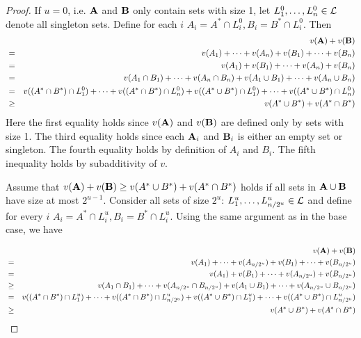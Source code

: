 \begin{proof}
\smallskip
{} If $u=0$, i.e. $\mathbf{A}$ and $\mathbf{B}$ only contain sets with size 1, let $L^{0}_1, \dots, L^{0}_{n} \in \mathcal{L}$ denote all singleton sets. Define for each $i$ $A_i = A^* \cap L^{0}_i, B_i = B^* \cap L^{0}_i$. Then
\begin{eqnarray*}
	& &v(\mathbf{A}) + v(\mathbf{B}) \\
	&=& v(A_1) + \dots + v(A_n) +  v(B_1) + \dots + v(B_n) \\
	& = & v(A_1) + v(B_1) + \dots + v(A_n) + v(B_n) \\
	& = & v(A_1 \cap B_1) + \dots + v(A_n \cap B_n) + v(A_1 \cup B_1) + \dots + v(A_n \cup B_n) \\
	& = & v((A^* \cap B^*) \cap L^{0}_1) + \dots + v( (A^* \cap B^*) \cap L^{0}_n) +  v( (A^* \cup B^*) \cap L^{0}_1) + \dots + v( (A^* \cup B^*) \cap L^{0}_n) \\
	& \geq & v(A^{*} \cup B^{*}) + v(A^{*} \cap B^{*})
\end{eqnarray*}
Here the first equality holds since $v(\mathbf{A})$ and $v(\mathbf{B})$ are defined only by sets with size 1.
The third equality holds since each $\mathbf{A}_i$ and $\mathbf{B}_i$ is either an empty set or singleton. The fourth equality holds by definition of $A_i$ and $B_i$. The fifth inequality holds by subadditivity of $v$.

\smallskip
{} Assume that $v(\mathbf{A}) + v(\mathbf{B}) \geq v(A^{*} \cup B^{*}) + v(A^{*} \cap B^{*})$ holds if all sets in $\mathbf{A}\cup \mathbf{B}$ have size at most $2^{u-1}$. Consider all sets of size $2^u$: $L^{u}_1, \dots, L^{u}_{n/2^u} \in \mathcal{L}$ and define for every $i$ $A_i = A^* \cap L^{u}_i, B_i = B^* \cap L^{u}_i$. Using the same argument as in the base case, we have 

\begin{eqnarray*}
& &v(\mathbf{A}) + v(\mathbf{B})\\
& = &v(A_1) + \dots + v(A_{n/2^{u}}) +  v(B_1) + \dots + v(B_{n/2^{u}})\\
& =  & v(A_1) + v(B_1) + \dots + v(A_{n/2^{u}}) + v(B_{n/2^{u}}) \\
& \geq & v(A_1 \cap B_1) + \dots + v(A_{n/2^{u}} \cap B_{n/2^{u}}) + v(A_1 \cup B_1) + \dots + v(A_{n/2^{u}} \cup B_{n/2^{u}}) \\
& = & v( (A^* \cap B^*) \cap L^{u}_1) + \dots + v( (A^* \cap B^*) \cap L^{u}_{n/2^{u}}) +  v( (A^* \cup B^*) \cap L^{u}_1) + \dots + v( (A^* \cup B^*) \cap L^{u}_{n/2^{u}}) \\
&\geq &v(A^{*} \cup B^{*}) + v(A^{*} \cap B^{*})
\end{eqnarray*}


\end{proof}
